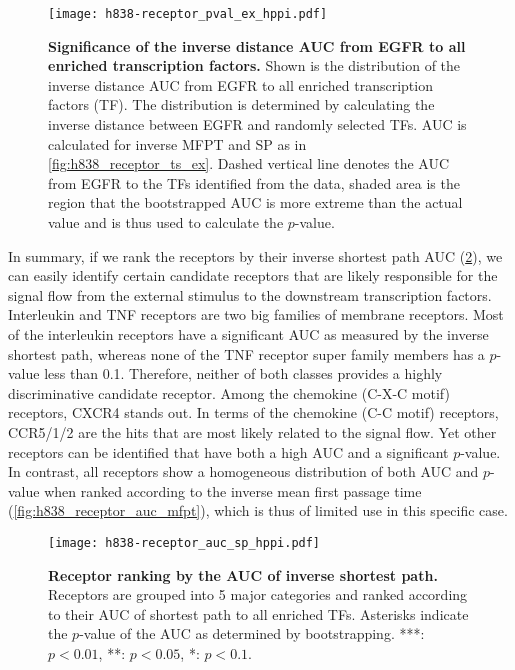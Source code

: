 \begin{figure}[!ht]
\begin{center}
\texttt{[image: h838-receptor\_pval\_ex\_hppi.pdf]}
\end{center}
\caption[Significance of the inverse distance AUC]{
{\bf Significance of the inverse distance AUC from EGFR to
all enriched transcription factors.} 
Shown is the distribution of the inverse distance AUC from
EGFR to all enriched transcription factors (TF). 
The distribution
is determined by calculating the inverse distance between
EGFR and randomly selected TFs.
AUC is calculated for inverse MFPT and SP as in 
\ref{fig:h838_receptor_ts_ex}. Dashed vertical line
denotes the AUC from EGFR to the TFs identified from the
data, shaded area is the region that the bootstrapped 
AUC is more extreme than the actual value and is thus used
to calculate the $p$-value.
}
\label{fig:h838_receptor_pval_ex}
\end{figure}

In summary, if we rank the receptors by their inverse
shortest path AUC (\ref{fig:h838_receptor_auc_sp}), we
can easily identify certain candidate receptors that
are likely responsible for the signal flow from the external
stimulus to the downstream transcription factors. 
Interleukin and TNF receptors are two big families of 
membrane receptors. Most of the interleukin receptors have
a significant AUC as measured by the inverse shortest path,
whereas none of the TNF receptor super family members has
a $p$-value less than 0.1. Therefore, neither of both 
classes provides a highly discriminative candidate receptor.
Among the chemokine (C-X-C motif) receptors, CXCR4 stands
out. In terms of the chemokine (C-C motif) receptors, 
CCR5/1/2 are the hits that are most likely related to the
signal flow. Yet other receptors can be identified that
have both a high AUC and a significant $p$-value.
In contrast, all receptors show a homogeneous distribution
of both AUC and $p$-value when ranked according to the 
inverse mean first passage time 
(\ref{fig:h838_receptor_auc_mfpt}), which is thus of
limited use in this specific case.

\begin{figure}[!ht]
\begin{center}
\texttt{[image: h838-receptor\_auc\_sp\_hppi.pdf]}
\end{center}
\caption[Receptor ranking by inverse SP]{
{\bf Receptor ranking by the AUC of inverse shortest path.} 
Receptors are grouped into 5 major categories and ranked
according to their AUC of shortest path to all enriched TFs.
Asterisks indicate the $p$-value of the AUC as determined by
bootstrapping. ***: $p<0.01$, **: $p<0.05$, *: $p<0.1$.
}
\label{fig:h838_receptor_auc_sp}
\end{figure}

